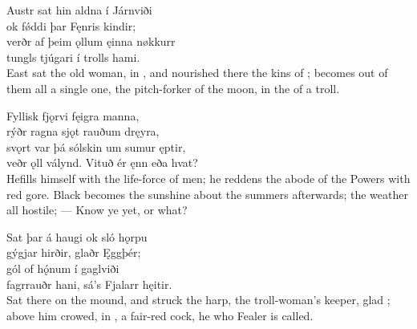 \bva Austr sat hin aldna \hld í Járnviði \\%
ok fǿddi þar \hld Fęnris kindir; \\%
verðr af þeim ǫllum \hld ęinna nøkkurr \\%
tungls tjúgari \hld í trolls hami.\\%

\bvb East sat the old woman, in , and nourished there the kins of ; becomes out of them all a single one, the pitch-forker of the moon, in the  of a troll.\footnotemark[1]\\%

\bva Fyllisk fjǫrvi \hld fęigra manna, \\%
rýðr ragna sjǫt \hld rauðum dręyra, \\%
svǫrt var þá sólskin \hld um sumur ęptir, \\%
veðr ǫll válynd. \hld Vituð ér ęnn eða hvat?\\%

\bvb He\footnotemark[1] fills himself with the life-force of  men; he reddens the abode of the Powers with red gore. Black becomes the sunshine about the summers afterwards\footnotemark[2]; the weather all hostile; — Know ye yet, or what?\\%

\bva Sat þar á haugi \hld ok sló hǫrpu \\%
gýgjar hirðir, \hld glaðr Ęggþér; \\%
gól of hǫ́num \hld í gaglviði \\%
fagrrauðr hani, \hld sá’s Fjalarr hęitir.\\%

\bvb Sat there on the mound, and struck the harp, the troll-woman’s keeper, glad ; above him crowed, in , a fair-red cock, he who Fealer is called.\\%

